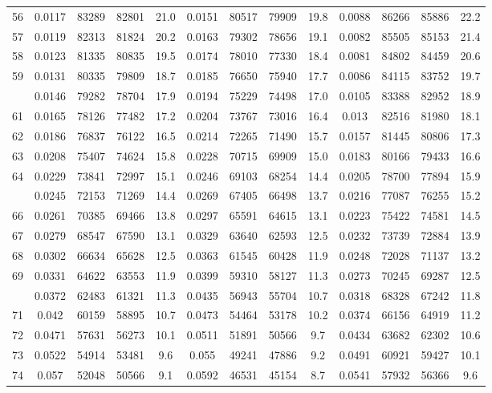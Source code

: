 \documentclass[
  14pt,
]{article}
\begin{document}
\begin{longtable}[t]{lcccccccccccc}
56 & 0.0117 & 83289 & 82801 & 21.0 & 0.0151 & 80517 & 79909 & 19.8 & 0.0088 & 86266 & 85886 & 22.2\\
57 & 0.0119 & 82313 & 81824 & 20.2 & 0.0163 & 79302 & 78656 & 19.1 & 0.0082 & 85505 & 85153 & 21.4\\
58 & 0.0123 & 81335 & 80835 & 19.5 & 0.0174 & 78010 & 77330 & 18.4 & 0.0081 & 84802 & 84459 & 20.6\\
59 & 0.0131 & 80335 & 79809 & 18.7 & 0.0185 & 76650 & 75940 & 17.7 & 0.0086 & 84115 & 83752 & 19.7\\
\addlinespace
60 & 0.0146 & 79282 & 78704 & 17.9 & 0.0194 & 75229 & 74498 & 17.0 & 0.0105 & 83388 & 82952 & 18.9\\
61 & 0.0165 & 78126 & 77482 & 17.2 & 0.0204 & 73767 & 73016 & 16.4 & 0.013 & 82516 & 81980 & 18.1\\
62 & 0.0186 & 76837 & 76122 & 16.5 & 0.0214 & 72265 & 71490 & 15.7 & 0.0157 & 81445 & 80806 & 17.3\\
63 & 0.0208 & 75407 & 74624 & 15.8 & 0.0228 & 70715 & 69909 & 15.0 & 0.0183 & 80166 & 79433 & 16.6\\
64 & 0.0229 & 73841 & 72997 & 15.1 & 0.0246 & 69103 & 68254 & 14.4 & 0.0205 & 78700 & 77894 & 15.9\\
\addlinespace
65 & 0.0245 & 72153 & 71269 & 14.4 & 0.0269 & 67405 & 66498 & 13.7 & 0.0216 & 77087 & 76255 & 15.2\\
66 & 0.0261 & 70385 & 69466 & 13.8 & 0.0297 & 65591 & 64615 & 13.1 & 0.0223 & 75422 & 74581 & 14.5\\
67 & 0.0279 & 68547 & 67590 & 13.1 & 0.0329 & 63640 & 62593 & 12.5 & 0.0232 & 73739 & 72884 & 13.9\\
68 & 0.0302 & 66634 & 65628 & 12.5 & 0.0363 & 61545 & 60428 & 11.9 & 0.0248 & 72028 & 71137 & 13.2\\
69 & 0.0331 & 64622 & 63553 & 11.9 & 0.0399 & 59310 & 58127 & 11.3 & 0.0273 & 70245 & 69287 & 12.5\\
\addlinespace
70 & 0.0372 & 62483 & 61321 & 11.3 & 0.0435 & 56943 & 55704 & 10.7 & 0.0318 & 68328 & 67242 & 11.8\\
71 & 0.042 & 60159 & 58895 & 10.7 & 0.0473 & 54464 & 53178 & 10.2 & 0.0374 & 66156 & 64919 & 11.2\\
72 & 0.0471 & 57631 & 56273 & 10.1 & 0.0511 & 51891 & 50566 & 9.7 & 0.0434 & 63682 & 62302 & 10.6\\
73 & 0.0522 & 54914 & 53481 & 9.6 & 0.055 & 49241 & 47886 & 9.2 & 0.0491 & 60921 & 59427 & 10.1\\
74 & 0.057 & 52048 & 50566 & 9.1 & 0.0592 & 46531 & 45154 & 8.7 & 0.0541 & 57932 & 56366 & 9.6\\

\end{longtable}
\end{document}
